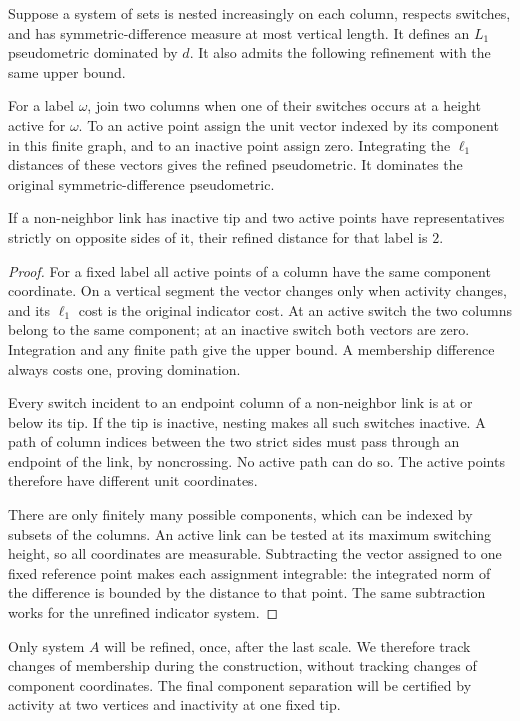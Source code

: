 \begin{lemma}\label{sets:component-refinement}
Suppose a system of sets is nested increasingly on each column, respects
switches, and has symmetric-difference measure at most vertical length.
It defines an $L_1$ pseudometric dominated by $d$. It also admits the
following refinement with the same upper bound.

For a label $\omega$, join two columns when one of their switches occurs
at a height active for $\omega$. To an active point assign the unit vector
indexed by its component in this finite graph, and to an inactive point
assign zero. Integrating the $\ell_1$ distances of these vectors gives the
refined pseudometric. It dominates the original symmetric-difference
pseudometric.

If a non-neighbor link has inactive tip and two active points have
representatives strictly on opposite sides of it, their refined distance
for that label is $2$.
\end{lemma}
\begin{proof}
For a fixed label all active points of a column have the same component
coordinate. On a vertical segment the vector changes only when activity
changes, and its $\ell_1$ cost is the original indicator cost. At an active
switch the two columns belong to the same component; at an inactive switch
both vectors are zero. Integration and any finite path give the upper
bound. A membership difference always costs one, proving domination.

Every switch incident to an endpoint column of a non-neighbor link is at
or below its tip. If the tip is inactive, nesting makes all such switches
inactive. A path of column indices between the two strict sides must pass
through an endpoint of the link, by noncrossing. No active path can do so.
The active points therefore have different unit coordinates.

There are only finitely many possible components, which can be indexed by
subsets of the columns. An active link can be tested at its maximum
switching height, so all coordinates are measurable. Subtracting the vector
assigned to one fixed reference point makes each assignment integrable:
the integrated norm of the difference is bounded by the distance to that
point. The same subtraction works for the unrefined indicator system.
\end{proof}

Only system $A$ will be refined, once, after the last scale. We therefore
track changes of membership during the construction, without tracking
changes of component coordinates. The final component separation will
be certified by activity at two vertices and inactivity at one fixed tip.

